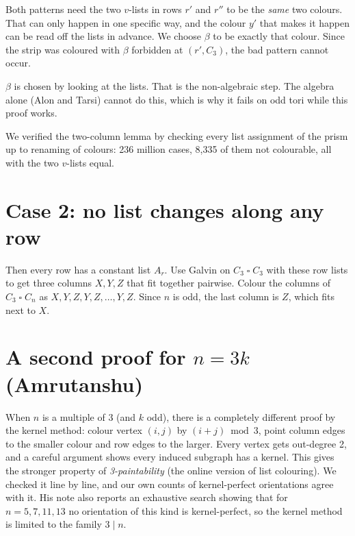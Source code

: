 \documentclass[11pt,oneside,openany]{book}
\newcommand{\T}{\mathbin{\square}}
\begin{document}
Both patterns need the two $v$-lists in rows $r'$ and $r''$ to be the \emph{same} two colours.
That can only happen in one specific way, and the colour $y'$ that makes it happen can be read off
the lists in advance. We choose $\beta$ to be exactly that colour. Since the strip was coloured
with $\beta$ forbidden at $(r', C_3)$, the bad pattern cannot occur.

\begin{keyidea}
$\beta$ is chosen by looking at the lists. That is the non-algebraic step. The algebra alone
(Alon and Tarsi) cannot do this, which is why it fails on odd tori while this proof works.
\end{keyidea}

We verified the two-column lemma by checking every list assignment of the prism up to renaming of
colours: 236 million cases, 8,335 of them not colourable, all with the two $v$-lists equal.

\section{Case 2: no list changes along any row}

Then every row has a constant list $A_r$. Use Galvin on $C_3 \T C_3$ with these row lists to get
three columns $X, Y, Z$ that fit together pairwise. Colour the columns of $C_3 \T C_n$ as
$X, Y, Z, Y, Z, \dots, Y, Z$. Since $n$ is odd, the last column is $Z$, which fits next to $X$.

\begin{center}
\end{center}

\section{A second proof for $n = 3k$ (Amrutanshu)}

When $n$ is a multiple of 3 (and $k$ odd), there is a completely different proof by the kernel
method: colour vertex $(i,j)$ by $(i+j) \bmod 3$, point column edges to the smaller colour and
row edges to the larger. Every vertex gets out-degree 2, and a careful argument shows every
induced subgraph has a kernel. This gives the stronger property of \emph{3-paintability} (the
online version of list colouring). We checked it line by line, and our own counts of
kernel-perfect orientations agree with it. His note also reports an exhaustive search showing
that for $n = 5, 7, 11, 13$ no orientation of this kind is kernel-perfect, so the kernel method
is limited to the family $3 \mid n$.
\end{document}
